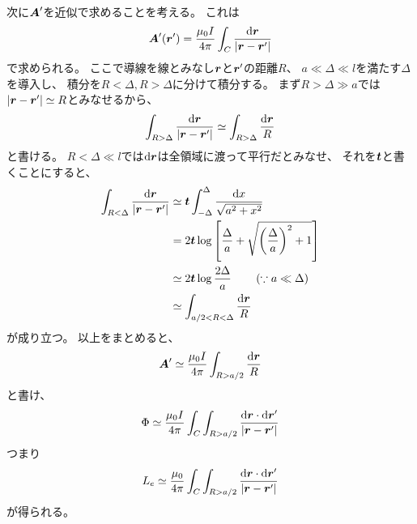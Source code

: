 \documentclass[a4paper, 12pt]{jsarticle}
\theoremstyle{definition}
\def\vec#1{\mbox{\boldmath $#1$}}
\newcommand{\ddif}{{\rm d}}
\begin{document}
次に$\vec{A}'$を近似で求めることを考える。
これは
\begin{align}
    \vec{A}' (\vec{r}')
    = \frac{\mu_0 I}{4\pi} \int_C \frac{\ddif \vec{r}}{|\vec{r} - \vec{r}'|}
\end{align}
で求められる。
ここで導線を線とみなし$\vec{r}$と$\vec{r}'$の距離$R$、
$a \ll \Delta \ll l$を満たす$\Delta$を導入し、
積分を$R < \Delta, R > \Delta$に分けて積分する。
まず$R > \Delta \gg a$では$|\vec{r} - \vec{r}'| \simeq R$とみなせるから、
\begin{align}
    \int_{R > \Delta} \frac{\ddif \vec{r}}{|\vec{r} - \vec{r}'|}
    \simeq \int_{R > \Delta} \frac{\ddif \vec{r}}{R}
\end{align}
と書ける。
$R < \Delta \ll l$では$\ddif \vec{r}$は全領域に渡って平行だとみなせ、
それを$\vec{t}$と書くことにすると、
\begin{align}
    \int_{R < \Delta} \frac{\ddif \vec{r}}{|\vec{r} - \vec{r}'|}
    &\simeq \vec{t}
    \int_{-\Delta}^{\Delta} \frac{\ddif x}{\sqrt{a^2 + x^2}} \\
    &= 2\vec{t}
    \log \left[ \frac{\Delta}{a} + \sqrt{\left( \frac{\Delta}{a} \right)^2 + 1} \right] \\
    &\simeq 2\vec{t} \log \frac{2\Delta}{a} \qquad
    \left( \because a \ll \Delta \right) \\
    &\simeq \int_{a/2 < R < \Delta} \frac{\ddif \vec{r}}{R}
\end{align}
が成り立つ。
以上をまとめると、
\begin{align}
    \vec{A}' \simeq \frac{\mu_0 I}{4\pi} \int_{R > a/2} \frac{\ddif \vec{r}}{R}
\end{align}
と書け、
\begin{align}
    \Phi \simeq \frac{\mu_0 I}{4\pi} \int_C \int_{R > a/2}
    \frac{\ddif \vec{r} \cdot \ddif \vec{r}'}{|\vec{r} - \vec{r}'|}
\end{align}
つまり
\begin{align}
    L_e \simeq \frac{\mu_0}{4\pi} \int_C \int_{R > a/2}
    \frac{\ddif \vec{r} \cdot \ddif \vec{r}'}{|\vec{r} - \vec{r}'|}
\end{align}
が得られる。
\end{document}
